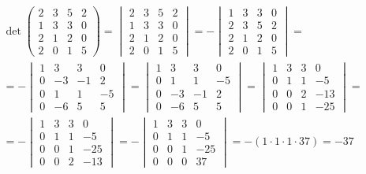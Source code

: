 \documentclass{article}
\begin{document}
\begin{gather*}
    \det
    \begin{pmatrix}
        2 & 3 & 5 & 2\\
        1 & 3 & 3 & 0\\
        2 & 1 & 2 & 0\\
        2 & 0 & 1 & 5
    \end{pmatrix} 
    =
    \begin{vmatrix}
        2 & 3 & 5 & 2\\
        1 & 3 & 3 & 0\\
        2 & 1 & 2 & 0\\
        2 & 0 & 1 & 5
    \end{vmatrix}
    =
    -
    \begin{vmatrix}
        1 & 3 & 3 & 0\\
        2 & 3 & 5 & 2\\
        2 & 1 & 2 & 0\\
        2 & 0 & 1 & 5
    \end{vmatrix}
    =
    \\
    =
    -
    \begin{vmatrix}
        1 & 3 & 3 & 0\\
        0 & -3 & -1 & 2\\
        0 & 1 & 1 & -5\\
        0 & -6 & 5 & 5
    \end{vmatrix}
    =
    \begin{vmatrix}
        1 & 3 & 3 & 0\\
        0 & 1 & 1 & -5\\
        0 & -3 & -1 & 2\\
        0 & -6 & 5 & 5
    \end{vmatrix}
    =
    \begin{vmatrix}
        1 & 3 & 3 & 0\\
        0 & 1 & 1 & -5\\
        0 & 0 & 2 & -13\\
        0 & 0 & 1 & -25
    \end{vmatrix}
    =
    \\
    =
    -
    \begin{vmatrix}
        1 & 3 & 3 & 0\\
        0 & 1 & 1 & -5\\
        0 & 0 & 1 & -25\\
        0 & 0 & 2 & -13
    \end{vmatrix}
    =
    -
    \begin{vmatrix}
        1 & 3 & 3 & 0\\
        0 & 1 & 1 & -5\\
        0 & 0 & 1 & -25\\
        0 & 0 & 0 & 37
    \end{vmatrix}
    =
    -(1 \cdot 1 \cdot 1 \cdot 37)
    =
    -37
\end{gather*}
\end{document}
